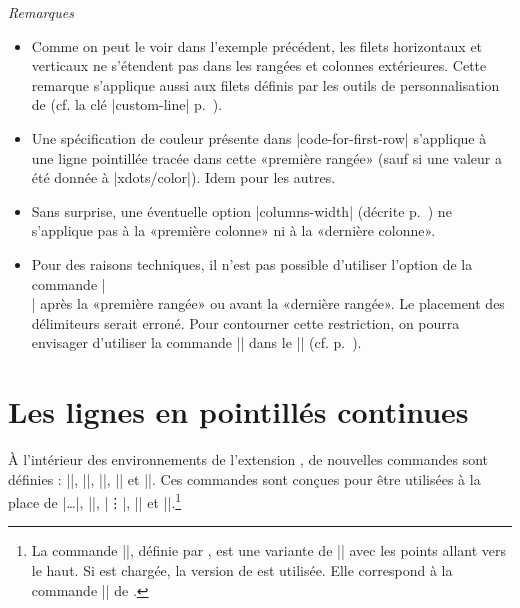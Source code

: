 \documentclass[dvipsnames]{article}%
\begin{document}
\emph{Remarques}
\begin{itemize}[beginpenalty=10000]
\item Comme on peut le voir dans l'exemple précédent, les filets horizontaux et
verticaux ne s'étendent pas dans les rangées et colonnes extérieures. Cette
remarque s'applique aussi aux filets définis par les outils de personnalisation
de  (cf. la clé |custom-line| p.~\pageref{custom-line}).

\item Une spécification de couleur présente dans |code-for-first-row| s'applique
à une ligne pointillée tracée dans cette «première rangée» (sauf si une valeur a
été donnée à |xdots/color|). Idem pour les autres.
\item Sans surprise, une éventuelle option |columns-width| (décrite
p.~\pageref{width}) ne s'applique pas à la «première colonne» ni à la «dernière
colonne».
\item Pour des raisons techniques, il n'est pas possible d'utiliser l'option de
la commande |\\| après la «première rangée» ou avant la «dernière rangée». Le
placement des délimiteurs serait erroné. Pour contourner cette restriction, on
pourra envisager d'utiliser la commande |\SubMatrix| dans le |\CodeAfter| (cf.
p.~\pageref{sub-matrix}).
\end{itemize}





\section{Les lignes en pointillés continues}

\label{Cdots}

À l'intérieur des environnements de l'extension , de nouvelles
commandes sont définies : |\Ldots|, |\Cdots|, |\Vdots|, |\Ddots| et |\Iddots|.
Ces commandes sont conçues pour être utilisées à la place de |\dots|, |\cdots|,
|\vdots|, |\ddots| et |\iddots|.\footnote{La commande |\iddots|, définie par
  , est une variante de |\ddots| avec les points allant vers le
  haut. Si  est chargée, la version de  est
  utilisée. Elle correspond à la commande |\adots| de .}
 \setcounter{fniddots}{\thefootnote}
\end{document}
